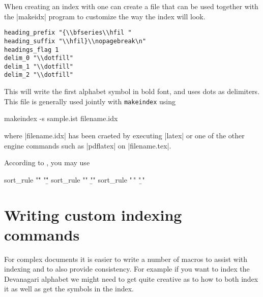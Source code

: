 When creating an index with  one can create a  file that can be used together with the |makeidx| program to customize the way the index will look.

\begin{verbatim}
heading_prefix "{\\bfseries\\hfil "
heading_suffix "\\hfil}\\nopagebreak\n"
headings_flag 1
delim_0 "\\dotfill"
delim_1 "\\dotfill"
delim_2 "\\dotfill"
\end{verbatim}

This will write the first alphabet symbol in bold font, and uses dots as delimiters. This file is generally  used jointly with \texttt{makeindex} using

\begin{teX}
makeindex -s sample.ist filename.idx
\end{teX}

where |filename.idx| has been craeted by executing |latex| or one of the other engine commands such as |pdflatex| on |filename.tex|.


According to , you may use

\begin{teX}
sort_rule "\." "\b\."
sort_rule "\:" "\b\:"
sort_rule "\," "\b\,"
\end{teX}


\section{Writing custom indexing commands}

For complex documents it is easier to write a number of macros to assist with indexing and to also provide consistency. For example if you want to index the Devanagari alphabet we might need to get quite creative as to how to both index it as well as get the symbols in the index.

%
%
%

